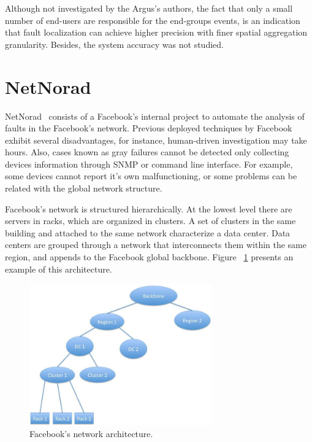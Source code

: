 Although not investigated by the Argus's authors, the fact that only a
small number
of end-users are responsible for the end-groups events, is an indication that
fault localization can achieve higher precision
with finer spatial aggregation granularity. Besides, the system accuracy was
not studied.

\section{NetNorad}

NetNorad~\cite{netnorad} consists of a Facebook's internal project to
automate the analysis of faults in the Facebook's
network. Previous deployed techniques by Facebook exhibit several
disadvantages, for instance,
human-driven investigation may take hours. Also, cases known as gray failures
cannot be detected only collecting devices information through SNMP or command
line
interface. For example, some devices cannot report it's own malfunctioning, or
some problems can be related with the global network structure.

Facebook's network is structured hierarchically. At the
lowest level there are servers in racks, which are organized in
clusters. A set of clusters in the same building and attached to
the same network characterize a data center. Data centers are grouped
through a network that interconnects them within the same region, and appends
to the Facebook global backbone. Figure
~\ref{fig:netnorad_network_architecture} presents an example of this
architecture.

\begin{figure}[H]
    \centering
    \includegraphics[width=0.7\textwidth]{./figures/literature_review/netnorad_network_architecture.jpg}
    \caption{Facebook's network architecture.~\cite{netnorad}}
\label{fig:netnorad_network_architecture}
\end{figure}%

